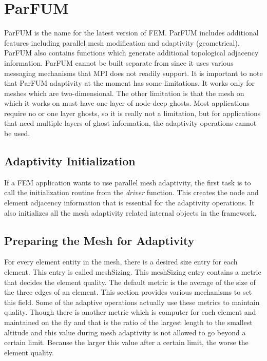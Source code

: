 \section{ParFUM}
\label{sec:ParFUM}

ParFUM is the name for the latest version of FEM. 
ParFUM includes additional features including parallel 
mesh modification and adaptivity (geometrical).  ParFUM also contains 
functions which generate additional topological adjacency 
information.  ParFUM cannot be built separate from \charmpp{} 
since it uses various messaging mechanisms that MPI does 
not readily support. It is important to note that ParFUM adaptivity
at the moment has some limitations. It works only for meshes which 
are two-dimensional. The other limitation is that the mesh on which 
it works on must have one layer of node-deep ghosts. Most applications 
require no or one layer ghosts, so it is really not a limitation,
but for applications that need multiple layers of ghost information,
the adaptivity operations cannot be used.


\subsection{Adaptivity Initialization}
If a FEM application wants to use parallel mesh adaptivity,
the first task is to call the initialization routine from the 
{\it driver} function. This creates the node and element 
adjacency information that is essential for the adaptivity 
operations. It also initializes all the mesh adaptivity related
internal objects in the framework.





\subsection{Preparing the Mesh for Adaptivity}
For every element entity in the mesh, there is a desired size entry 
for each element. This entry is called meshSizing. This meshSizing entry 
contains a metric that decides the element quality. The default metric is
the average of the size of the three edges of an element. This section 
provides various mechanisms to set this field. Some of the adaptive operations
actually use these metrics to maintain quality. Though there is another metric
which is computer for each element and maintained on the fly and that 
is the ratio of the largest length to the smallest altitude and this value 
during mesh adaptivity is not allowed to go beyond a certain limit. Because
the larger this value after a certain limit, the worse the element quality.

